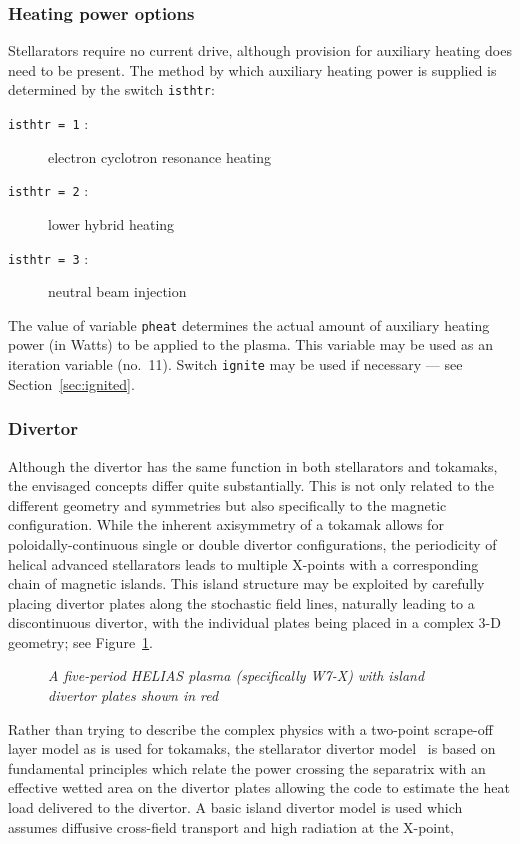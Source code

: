 \documentclass[11pt,a4paper]{report}
\begin{document}
\subsubsection{Heating power options}

Stellarators require no current drive, although provision for auxiliary
heating does need to be present. The method by which auxiliary heating power
is supplied is determined by the switch \texttt{isthtr}:
\begin{description}
\item [\texttt{isthtr = 1} :] electron cyclotron resonance heating
\item [\texttt{isthtr = 2} :] lower hybrid heating
\item [\texttt{isthtr = 3} :] neutral beam injection
\end{description}
The value of variable \texttt{pheat} determines the actual amount of auxiliary
heating power (in Watts) to be applied to the plasma. This variable may be
used as an iteration variable (no.\ 11). Switch \texttt{ignite} may be used if
necessary --- see Section~\ref{sec:ignited}.

\subsubsection{Divertor}

Although the divertor has the same function in both stellarators and tokamaks,
the envisaged concepts differ quite substantially. This is not only related to
the different geometry and symmetries but also specifically to the magnetic
configuration. While the inherent axisymmetry of a tokamak allows for
poloidally-continuous single or double divertor configurations, the
periodicity of helical advanced stellarators leads to multiple X-points with a
corresponding chain of magnetic islands. This island structure may be
exploited by carefully placing divertor plates along the stochastic field
lines, naturally leading to a discontinuous divertor, with the individual
plates being placed in a complex 3-D geometry; see Figure~\ref{fig:stelldiv}.

\begin{figure}[tbph]
\centerline{}
\caption[Stellarator island divertor configuration]
{\label{fig:stelldiv}
  \textit{A five-period HELIAS plasma (specifically W7-X) with island divertor
    plates shown in red}
}
\end{figure}

Rather than trying to describe the complex physics with a two-point scrape-off
layer model as is used for tokamaks, the stellarator divertor
model~\cite{stell_divertor} is based on fundamental principles which relate
the power crossing the separatrix with an effective wetted area on the
divertor plates allowing the code to estimate the heat load delivered to the
divertor. A basic island divertor model is used which assumes diffusive
cross-field transport and high radiation at the X-point,
\end{document}
